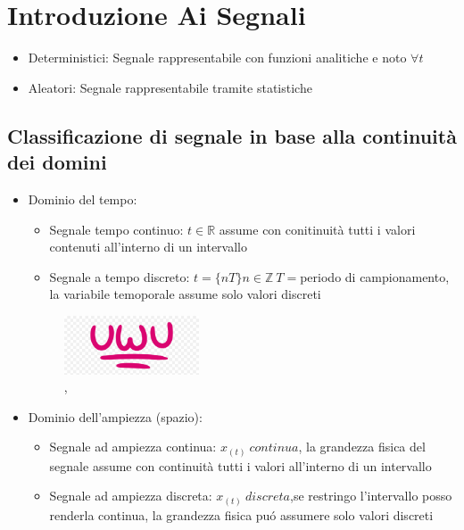 \section{Introduzione Ai Segnali}
    \begin{itemize}
        \item {
            Deterministici: Segnale rappresentabile con funzioni analitiche e noto $\forall t$
        }
        \item {
            Aleatori: Segnale rappresentabile tramite statistiche 
        }
    \end{itemize}
    \subsection{Classificazione di segnale in base alla continuità dei domini}
        \begin{itemize}
            \item {Dominio del tempo:
                    \begin{itemize}
                        \item{Segnale tempo continuo: $t \in \mathbb{R}$ assume con conitinuità tutti i valori contenuti all'interno di un intervallo}
                        \item {Segnale a tempo discreto: $t = \{ nT \} n \in \mathbb{Z} \ T=$periodo di campionamento, la variabile temoporale assume solo valori discreti}
                    \end{itemize}
                    \begin{figure}[h]
                        \centering
                        \includegraphics[width=4cm]{media/uwu.png}
                        \caption{\color{purple}{tempo continuo}, \color{blue}{tempo discreto}}
                        \label{fig:galaxy}
                    \end{figure}
            }
            \item {Dominio dell'ampiezza (spazio):
                    \begin{itemize}
                        \item{Segnale ad ampiezza continua: $x_{(t)}\ continua$, la grandezza fisica del segnale assume con continuità tutti i valori all'interno di un intervallo}
                        \item {Segnale ad ampiezza discreta: $x_{(t)}\ discreta$,se restringo l'intervallo posso renderla continua, la grandezza fisica puó assumere solo valori discreti}

\end{itemize}}
\end{itemize}
